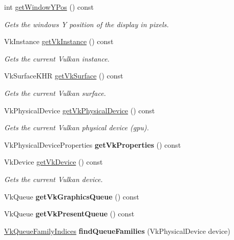 \begin{DoxyCompactItemize}
int \hyperlink{classflounder_1_1display_a9c0bb14dd6ffa98b4447d681fc4ca49b}{get\+Window\+Y\+Pos} () const
\begin{DoxyCompactList}\small\item\em Gets the windows Y position of the display in pixels. \end{DoxyCompactList}\item 
Vk\+Instance \hyperlink{classflounder_1_1display_a444c592ab06252c53b4600b2146f99f8}{get\+Vk\+Instance} () const
\begin{DoxyCompactList}\small\item\em Gets the current Vulkan instance. \end{DoxyCompactList}\item 
Vk\+Surface\+K\+HR \hyperlink{classflounder_1_1display_a8f3f994b876429d4b6440520b21f13fa}{get\+Vk\+Surface} () const
\begin{DoxyCompactList}\small\item\em Gets the current Vulkan surface. \end{DoxyCompactList}\item 
Vk\+Physical\+Device \hyperlink{classflounder_1_1display_a6599c6384b8174f97318956f8644e63c}{get\+Vk\+Physical\+Device} () const
\begin{DoxyCompactList}\small\item\em Gets the current Vulkan physical device (gpu). \end{DoxyCompactList}\item 
\mbox{\label{classflounder_1_1display_aacc74f8a47ffdecad6cb53623913fb85}} 
Vk\+Physical\+Device\+Properties {\bfseries get\+Vk\+Properties} () const
\item 
Vk\+Device \hyperlink{classflounder_1_1display_a6b6c7b12c56ae915cb2d06c77e9b6ba8}{get\+Vk\+Device} () const
\begin{DoxyCompactList}\small\item\em Gets the current Vulkan device. \end{DoxyCompactList}\item 
\mbox{\label{classflounder_1_1display_a9415870037ad1e9d00941031cfaea59a}} 
Vk\+Queue {\bfseries get\+Vk\+Graphics\+Queue} () const
\item 
\mbox{\label{classflounder_1_1display_a4d41d7162f63ce6d3234881010af9c64}} 
Vk\+Queue {\bfseries get\+Vk\+Present\+Queue} () const
\item 
\mbox{\label{classflounder_1_1display_a65a126334ca16abcf2342c08a5103489}} 
\hyperlink{structflounder_1_1_vk_queue_family_indices}{Vk\+Queue\+Family\+Indices} {\bfseries find\+Queue\+Families} (Vk\+Physical\+Device device)
\end{DoxyCompactItemize}
